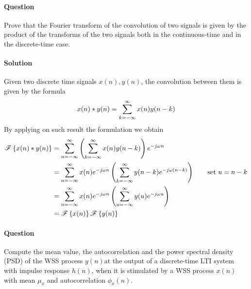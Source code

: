 \newquestion
	\paragraph{Question} Prove that the Fourier transform of the convolution of two signals is given by the product of the transforms of the two signals both in the continuous-time and in the discrete-time case.
	
	\paragraph{Solution} Given two discrete time signals $x(n),y(n)$, the convolution between them is given by the formula
	\[ x(n) * y(n) = \sum_{k=-\infty}^\infty x(n)y(n-k) \]
	By applying on such result the \dtft formulation we obtain
	\begin{align*}
		\mathscr{F}\left\{ x(n)*y(n) \right\} & = \sum_{n=-\infty}^\infty \left( \sum_{k=-\infty}^\infty x(n)y(n-k) \right) e^{-j\omega n} \\
		& = \sum_{n=-\infty}^\infty x(n) e^{-j\omega n} \left( \sum_{k=-\infty}^\infty y(n-k) e^{-j\omega(n-k)} \right) \qquad \textrm{set } u = n-k \\ &  = \sum_{n=-\infty}^\infty x(n) e^{-j\omega n} \left( \sum_{u=-\infty}^\infty y(u) e^{-j\omega u } \right) \\
		& = \mathscr{F}\left\{ x(n) \right\} \mathscr{F}\left\{ y(n) \right\}
	\end{align*}
	
\newquestion
	\paragraph{Question} Compute the mean value, the autocorrelation and the power spectral density (PSD) of the WSS process $y(n)$at the output of a discrete-time LTI system with impulse response $h(n)$, when it is stimulated by a WSS process $x(n)$ with mean $\mu_x$ and autocorrelation $\phi_x(n)$.

	
